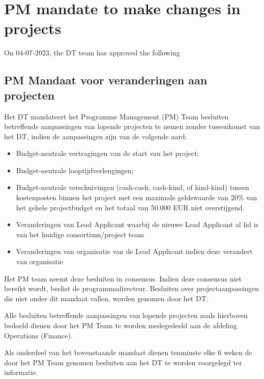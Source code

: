 \section{PM mandate to make changes in projects}
\label{app:pm-mandate}


On 04-07-2023, the DT team has approved the following 
\subsection*{PM Mandaat voor veranderingen aan projecten}
Het DT mandateert het Programme Management (PM) Team besluiten betreffende
aanpassingen van lopende projecten te nemen zonder tussenkomst van het DT, indien de aanpassingen zijn van de volgende
aard:
\begin{itemize}
\item Budget-neutrale vertragingen van de start van het project;
\item Budget-neutrale looptijdverlengingen;
\item Budget-neutrale verschuivingen (cash-cash, cash-kind, of kind-kind) tussen kostenposten binnen het project met een maximale
geldswaarde van 20\% van het gehele projectbudget en het totaal van 50.000 EUR niet overstijgend.
\item Veranderingen van Lead Applicant waarbij de nieuwe Lead Applicant al lid is
van het huidige consortium/project team
\item Veranderingen van organisatie van de Lead Applicant indien deze verandert van organisatie
\end{itemize}

Het PM team neemt deze besluiten in consensus. Indien deze consensus niet
bereikt wordt, beslist de programmadirecteur. Besluiten over projectaanpassingen die niet onder dit mandaat vallen,
worden genomen door het DT.

Alle besluiten betreffende aanpassingen van lopende projecten zoals hierboven
bedoeld dienen door het PM Team te worden medegedeeld aan de afdeling Operations (Finance).

Als onderdeel van het bovenstaande mandaat dienen tenminste elke 6 weken de
door het PM Team genomen besluiten aan het DT te worden voorgelegd ter informatie.
